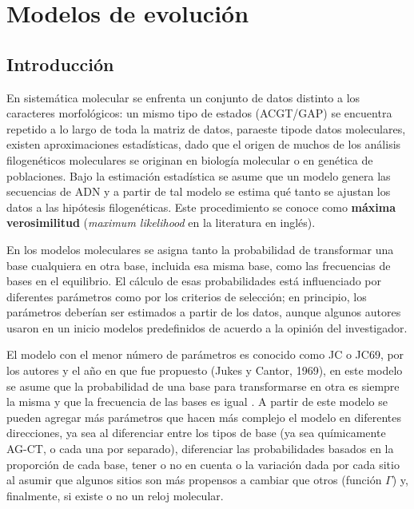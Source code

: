 %
%
\chapter{Modelos de evoluci\'on}


\section*{Introducci\'on}

\label{ch:molecular}
En sistem\'atica molecular se enfrenta un conjunto de datos distinto  a los caracteres morfol\'ogicos:  un mismo tipo de estados (ACGT/GAP) se encuentra repetido a lo largo de toda la matriz de datos, paraeste tipode datos moleculares, existen aproximaciones estad\'isticas, dado que el origen de muchos de los an\'alisis filogen\'eticos moleculares se originan en biolog\'ia molecular o en gen\'etica de poblaciones. Bajo la estimaci\'on estad\'istica se asume que un modelo genera las secuencias de ADN y a partir de tal modelo se estima qu\'e tanto se ajustan los datos a las hip\'otesis filogen\'eticas. Este procedimiento se conoce como \textbf{m\'axima verosimilitud} (\textit{maximum likelihood} en la literatura en ingl\'es).

En los modelos moleculares se asigna tanto la probabilidad de transformar una base cualquiera en otra base, incluida esa misma base, como las frecuencias de bases en el equilibrio. El c\'alculo de esas probabilidades est\'a influenciado por diferentes par\'ametros como por los criterios de selecci\'on; en principio, los par\'ametros deber\'ian ser estimados a partir  de los datos, aunque algunos autores usaron en un inicio modelos predefinidos de acuerdo a la opini\'on del investigador.

El modelo con el menor n\'umero de par\'ametros es conocido como JC o JC69, por los autores y el a\~no en que fue propuesto (Jukes y Cantor, 1969), en este modelo se asume que la probabilidad de una base para transformarse en otra es siempre la misma y que la frecuencia de las bases es igual \cite{Jukes1969}. A partir de este modelo se pueden agregar m\'as par\'ametros que hacen m\'as complejo el modelo en diferentes direcciones, ya sea al diferenciar entre los tipos de base (ya sea qu\'imicamente AG-CT, o cada una por separado), diferenciar las probabilidades basados en la proporci\'on de cada base, tener o no en cuenta o la variaci\'on dada por cada sitio al asumir que algunos sitios son m\'as propensos a cambiar que otros (funci\'on $\Gamma$) y, finalmente, si existe o no un reloj molecular.

